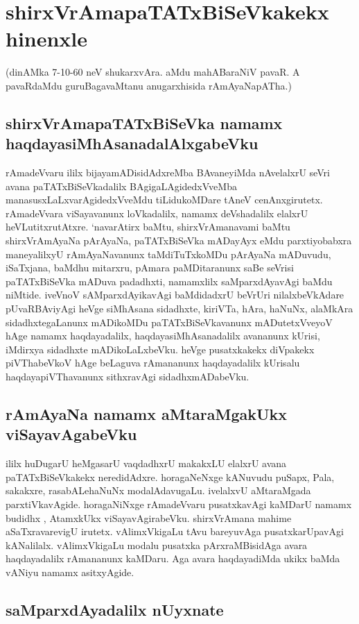 \chapter{shirxVrAmapaTATxBiSeVkakekx hinenxle}

(dinAMka 7-10-60 neV shukarxvAra. aMdu mahABaraNiV pavaR. A pavaRdaMdu guruBagavaMtanu anugarxhisida rAmAyaNapATha.)

\section*{shirxVrAmapaTATxBiSeVka namamx haqdayasiMhAsanadalAlxgabeVku}

rAmadeVvaru ililx bijayamADisidAdxreMba BAvaneyiMda nAvelalxrU seVri avana paTATxBiSeVkadalilx BAgigaLAgidedxVveMba manasusxLaLxvarAgidedxVveMdu tiLidukoMDare tAneV cenAnxgirutetx. rAmadeVvara viSayavanunx loVkadalilx, namamx deVshadalilx elalxrU heVLutitxrutAtxre. `navarAtirx baMtu, shirxVrAmanavami baMtu shirxVrAmAyaNa pArAyaNa, paTATxBiSeVka mADayAyx eMdu parxtiyobabxra maneyalilxyU rAmAyaNavanunx taMdiTuTxkoMDu pArAyaNa mADuvudu, iSaTxjana, baMdhu mitarxru, pAmara paMDitaranunx saBe seVrisi paTATxBiSeVka mADuva padadhxti, namamxlilx saMparxdAyavAgi baMdu niMtide. iveVnoV sAMparxdAyikavAgi baMdidadxrU beVrUri nilalxbeVkAdare pUvaRBAviyAgi heVge siMhAsana sidadhxte, kiriVTa, hAra, haNuNx, alaMkAra sidadhxtegaLanunx mADikoMDu paTATxBiSeVkavanunx mADutetxVveyoV hAge namamx haqdayadalilx, haqdayasiMhAsanadalilx avananunx kUrisi, iMdirxya sidadhxte mADikoLaLxbeVku. heVge pusatxkakekx diVpakekx piVThabeVkoV hAge beLaguva rAmananunx haqdayadalilx kUrisalu haqdayapiVThavanunx sithxravAgi sidadhxmADabeVku.

\section*{rAmAyaNa namamx aMtaraMgakUkx viSayavAgabeVku}

ililx huDugarU heMgasarU vaqdadhxrU makakxLU elalxrU avana paTATxBiSeVkakekx neredidAdxre. horagaNeNxge kANuvudu puSapx, Pala, sakakxre, rasabALehaNuNx modalAdavugaLu. ivelalxvU aMtaraMgada parxtiVkavAgide. horagaNiNxge rAmadeVvaru pusatxkavAgi kaMDarU namamx budidhx , AtamxkUkx viSayavAgirabeVku. shirxVrAmana mahime aSaTxravarevigU irutetx. vAlimxVkigaLu tAvu bareyuvAga pusatxkarUpavAgi kANalilalx. vAlimxVkigaLu modalu pusatxka pArxraMBisidAga avara haqdayadalilx rAmananunx kaMDaru. Aga avara haqdayadiMda ukikx baMda vANiyu namamx asitxyAgide.

\section*{saMparxdAyadalilx nUyxnate}


